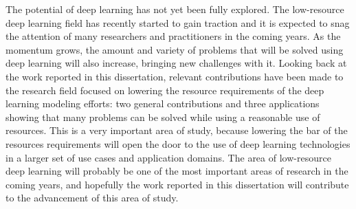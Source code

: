 The potential of deep learning has not yet been fully explored. The low-resource deep learning field has recently started to gain traction and it is expected to snag the attention of many researchers and practitioners in the coming years. As the momentum grows, the amount and variety of problems that will be solved using deep learning will also increase, bringing new challenges with it. Looking back at the work reported in this dissertation, relevant contributions have been made to the research field focused on lowering the resource requirements of the deep learning modeling efforts: two general contributions and three applications showing that many problems can be solved while using a reasonable use of resources. This is a very important area of study, because lowering the bar of the resources requirements will open the door to the use of deep learning technologies in a larger set of use cases and application domains.  The area of low-resource deep learning will probably be one of the most important areas of research in the coming years, and hopefully the work reported in this dissertation will contribute to the advancement of this area of study.

